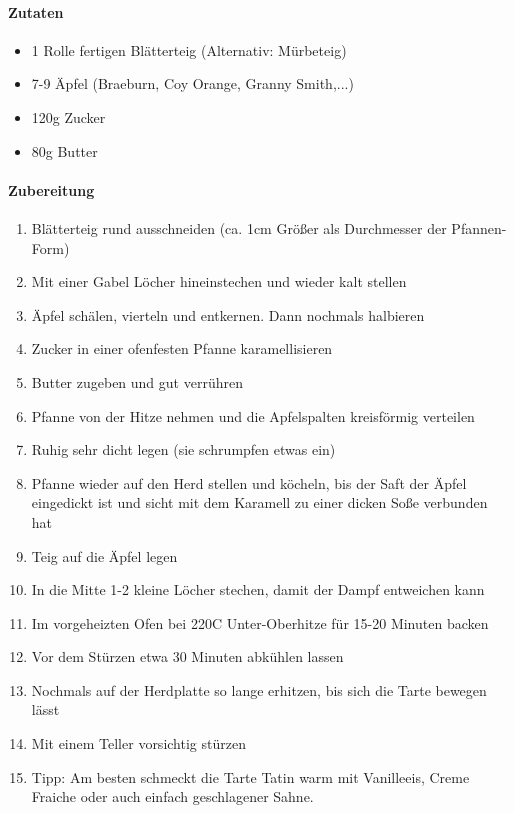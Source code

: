 \clearpage
{}
\paragraph{Zutaten}
\begin{itemize}[noitemsep]
	\item 1 Rolle fertigen Blätterteig (Alternativ: Mürbeteig)
	\item 7-9 Äpfel (Braeburn, Coy Orange, Granny Smith,...)
	\item 120g Zucker
	\item 80g Butter
\end{itemize}

\paragraph{Zubereitung}
\begin{enumerate}[noitemsep]
	\item Blätterteig rund ausschneiden (ca. 1cm Größer als Durchmesser der Pfannen-Form)
	\item Mit einer Gabel Löcher hineinstechen und wieder kalt stellen
	\item Äpfel schälen, vierteln und entkernen. Dann nochmals halbieren
	\item Zucker in einer ofenfesten Pfanne karamellisieren
	\item Butter zugeben und gut verrühren
	\item Pfanne von der Hitze nehmen und die Apfelspalten kreisförmig verteilen
	\item Ruhig sehr dicht legen (sie schrumpfen etwas ein)
	\item Pfanne wieder auf den Herd stellen und köcheln, bis der Saft der Äpfel eingedickt ist und sicht mit dem Karamell zu einer dicken Soße verbunden hat
	\item Teig auf die Äpfel legen
	\item In die Mitte 1-2 kleine Löcher stechen, damit der Dampf entweichen kann
	\item Im vorgeheizten Ofen bei 220\textdegree C Unter-Oberhitze für 15-20 Minuten backen
	\item Vor dem Stürzen etwa 30 Minuten abkühlen lassen
	\item Nochmals auf der Herdplatte so lange erhitzen, bis sich die Tarte bewegen lässt
	\item Mit einem Teller vorsichtig stürzen
	\item Tipp: Am besten schmeckt die Tarte Tatin warm mit Vanilleeis, Creme Fraiche oder auch einfach geschlagener Sahne.  
\end{enumerate}